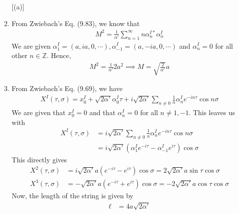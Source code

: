 \documentclass[11pt]{article}
\newcommand{\Z}{\mathbb{Z}}
\begin{document}
\begin{enumerate} [(a)]
    \item From Zwiebach's Eq. (9.83), we know that 
    \begin{align*}
        M^2 = \frac{1}{\alpha'} \sum_{n=1}^\infty n \alpha_n^{I*} \alpha_n^I
    \end{align*}
    We are given $\alpha_1^I = (a, ia, 0, \cdots), \alpha_{-1}^I = (a, -ia, 0, \cdots)$ and $\alpha_n^I = 0$ for all other $n \in \Z$. Hence, 
    \begin{align*}
        M^2 = \frac{1}{\alpha'} 2a^2 \implies M = \sqrt{\frac{2}{\alpha'}} a 
    \end{align*}
    
    \item From Zwiebach's Eq. (9.69), we have 
    \begin{align*}
        X^I(\tau, \sigma) = x^I_0 + \sqrt{2\alpha' } \alpha^I_0 \tau + i \sqrt{2\alpha' }\sum_{n \neq 0} \frac{1}{n}\alpha^I_n e^{-in\tau} \cos n \sigma
    \end{align*}
    We are given that $x^I_0 = 0$ and that $\alpha_n^I = 0$ for all $n \neq 1,-1$. This leaves us with 
    \begin{align*}
        X^I(\tau, \sigma) &= i \sqrt{2\alpha' }\sum_{n \neq 0} \frac{1}{n}\alpha^I_n e^{-in\tau} \cos n \sigma \\
        &= i \sqrt{2\alpha'} \left(\alpha^I_1 e^{-i\tau} - \alpha^I_{-1} e^{i\tau}  \right) \cos\sigma
    \end{align*}
    This directly gives 
    \begin{align*}
        X^2(\tau, \sigma) &= i \sqrt{2\alpha'} a \left(e^{-i\tau} -  e^{i\tau} \right) \cos\sigma = 2 \sqrt{2\alpha'} a \sin\tau \cos \sigma \\
        X^3(\tau, \sigma) &=  -\sqrt{2\alpha'} a\left(e^{-i\tau} + e^{i\tau}  \right) \cos\sigma = -2\sqrt{2\alpha'} a \cos\tau \cos \sigma 
    \end{align*}
    Now, the length of the string is given by 
    \begin{align*}
        \ell &= 4a\sqrt{2\alpha'} 
    \end{align*}


\end{enumerate}
\end{document}
